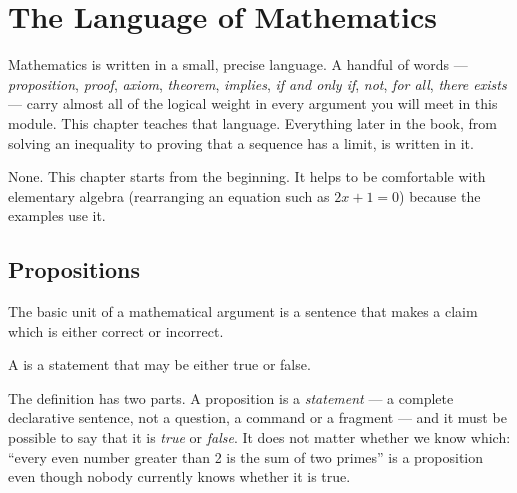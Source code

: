 \chapter{The Language of Mathematics}\label{ch:logic}

\begin{chapterintro}
Mathematics is written in a small, precise language. A handful of words --- \emph{proposition},
\emph{proof}, \emph{axiom}, \emph{theorem}, \emph{implies}, \emph{if and only if}, \emph{not},
\emph{for all}, \emph{there exists} --- carry almost all of the logical weight in every argument you
will meet in this module. This chapter teaches that language. Everything later in the book, from
solving an inequality to proving that a sequence has a limit, is written in it.
\end{chapterintro}

\begin{prerequisites}
None. This chapter starts from the beginning. It helps to be comfortable with elementary algebra
(rearranging an equation such as $2x+1=0$) because the examples use it.
\end{prerequisites}

\section{Propositions}\label{sec:propositions}

The basic unit of a mathematical argument is a sentence that makes a claim which is either correct or
incorrect.

\begin{definition}
A  is a statement that may be either true or false. 
\end{definition}

The definition has two parts. A proposition is a \emph{statement} --- a complete declarative sentence,
not a question, a command or a fragment --- and it must be possible to say that it is \emph{true} or
\emph{false}. It does not matter whether we know which: ``every even number greater than 2 is the sum of
two primes'' is a proposition even though nobody currently knows whether it is true.

